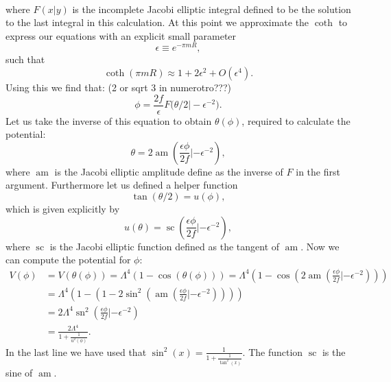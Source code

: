 \documentclass[master,       %
               twoside,        %
               BCOR10mm,       %
               english,ngerman, %
               ]{GAUBM}
\begin{document}
\begin{otherlanguage}{english}
\begin{align}
\end{align}
where $F(x|y)$ is the incomplete Jacobi elliptic integral defined to be the solution to the last integral in this calculation.
At this point we approximate the $\coth$ to express our equations with an explicit small parameter 
\begin{equation}
	\epsilon \equiv e^{-\pi m R},
\end{equation}
such that
\begin{equation}
	\coth(\pi m R) \approx 1 + 2 \epsilon^2 + O(\epsilon^4).
\end{equation}
Using this we find that: (2 or sqrt 3 in numerotro???)
\begin{equation}
	\phi = \frac{2 f}{\epsilon} F\big(\theta / 2 \big| - \epsilon^{-2} \big).
\end{equation}
Let us take the inverse of this equation to obtain $\theta(\phi)$, required to calculate the potential:
\begin{equation}
	\theta = 2 \operatorname{am}(\frac{\epsilon \phi}{2 f} | - \epsilon^{-2}),
\end{equation} 
where $\operatorname{am}$ is the Jacobi elliptic amplitude define as the inverse of $F$ in the first argument.
Furthermore let us defined a helper function 
\begin{equation}
	\tan(\theta / 2) = u(\phi),
\end{equation}
which is given explicitly by
\begin{equation}
	u(\theta) = \operatorname{sc}(\frac{\epsilon \phi}{2 f} | - \epsilon^{-2}),
\end{equation}
where $\operatorname{sc}$ is the Jacobi elliptic function defined as the tangent of $\operatorname{am}$. 
Now we can compute the potential for $\phi$:
\begin{align}
	V(\phi) &= V(\theta(\phi)) = \Lambda^4 (1 - \cos (\theta(\phi)))
	= \Lambda^4 ( 1 - \cos (2 \operatorname{am} ( \frac{\epsilon \phi}{2 f} | - \epsilon^{-2}) )) \nonumber \\
	&= \Lambda^4 ( 1 - (1 - 2 \sin^2( \operatorname{am}(\frac{\epsilon \phi}{2 f} | - \epsilon^{-2})))) \nonumber \\
	&= 2 \Lambda^4 \operatorname{sn}^2 ( \frac{\epsilon \phi}{2 f} | - \epsilon^{-2} ) \nonumber \\
	&= \frac{2 \Lambda^4}{1 + \frac{1}{u^2(\phi)}}.
\end{align}
In the last line we have used that $\sin^2(x) = \frac{1}{1 + \frac{1}{\tan^2(x)}}$. The function $\operatorname{sc}$ is the sine of $\operatorname{am}$.

\end{otherlanguage}
\end{document}
